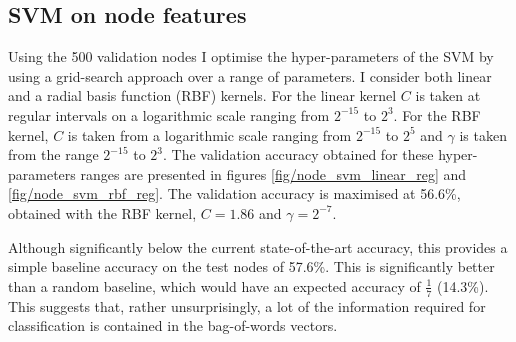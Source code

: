 \documentclass[12pt]{article}
\theoremstyle{definition}
\begin{document}
\subsection{SVM on node features}
Using the 500 validation nodes I optimise the hyper-parameters of the SVM by using a grid-search approach over a range of parameters. I consider both linear and a radial basis function (RBF) kernels. For the linear kernel $C$ is taken at regular intervals on a logarithmic scale ranging from $2^{-15}$ to $2^3$. For the RBF kernel, $C$ is taken from a logarithmic scale ranging from $2^{-15}$ to $2^5$ and $\gamma$ is taken from the range $2^{-15}$ to $2^3$. The validation accuracy obtained for these hyper-parameters ranges are presented in figures \ref{fig/node_svm_linear_reg} and \ref{fig/node_svm_rbf_reg}. The validation accuracy is maximised at 56.6\%, obtained with the RBF kernel, $C=1.86$ and $\gamma=2^{-7}$. 

\bigskip

Although significantly below the current state-of-the-art accuracy, this provides a simple baseline accuracy on the test nodes of 57.6\%. This is significantly better than a random baseline, which would have an expected accuracy of $\frac{1}{7}$ (14.3\%). This suggests that, rather unsurprisingly, a lot of the information required for classification is contained in the bag-of-words vectors. 
\end{document}
